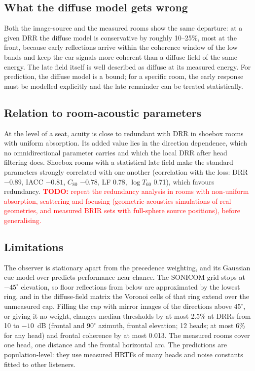 \documentclass[11pt]{article}
\newcommand{\todo}[1]{\textcolor{red}{\textbf{TODO:} #1}}
\begin{document}
\subsection{What the diffuse model gets wrong}
Both the image-source and the measured rooms show the same departure: at a given DRR the diffuse model is conservative by roughly 10--25\%, most at the front, because early reflections arrive within the coherence window of the low bands and keep the ear signals more coherent than a diffuse field of the same energy. The late field itself is well described as diffuse at its measured energy. For prediction, the diffuse model is a bound; for a specific room, the early response must be modelled explicitly and the late remainder can be treated statistically.

\subsection{Relation to room-acoustic parameters}
At the level of a seat, acuity is close to redundant with DRR in shoebox rooms with uniform absorption. Its added value lies in the direction dependence, which no omnidirectional parameter carries and which the local DRR after head filtering does. Shoebox rooms with a statistical late field make the standard parameters strongly correlated with one another (correlation with the loss: DRR $-0.89$, IACC $-0.81$, $C_{80}$ $-0.78$, LF 0.78, $\log T_{60}$ 0.71), which favours redundancy. \todo{repeat the redundancy analysis in rooms with non-uniform absorption, scattering and focusing (geometric-acoustics simulations of real geometries, and measured BRIR sets with full-sphere source positions), before generalising.}

\subsection{Limitations}
The observer is stationary apart from the precedence weighting, and its Gaussian cue model over-predicts performance near chance. The SONICOM grid stops at $-45^\circ$ elevation, so floor reflections from below are approximated by the lowest ring, and in the diffuse-field matrix the Voronoi cells of that ring extend over the unmeasured cap. Filling the cap with mirror images of the directions above $45^\circ$, or giving it no weight, changes median thresholds by at most 2.5\% at DRRs from 10 to $-10$~dB (frontal and $90^\circ$ azimuth, frontal elevation; 12 heads; at most 6\% for any head) and frontal coherence by at most 0.013. The measured rooms cover one head, one distance and the frontal horizontal arc. The predictions are population-level: they use measured HRTFs of many heads and noise constants fitted to other listeners.
\end{document}
